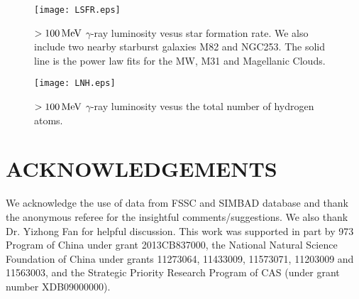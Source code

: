 \documentclass[useAMS,usenatbib,referee]{mn2e}
\begin{document}
\begin{figure}
\texttt{[image: LSFR.eps]}
 \caption{$>100\,\rm MeV$ $\gamma$-ray luminosity vesus star formation rate. We also include two nearby starburst galaxies M82 and NGC253. The solid line is the power law fits for the MW, M31 and Magellanic Clouds.}
 \label{lsfr}
\end{figure}

\begin{figure}
\texttt{[image: LNH.eps]}
 \caption{$>100\,\rm MeV$ $\gamma$-ray luminosity vesus the total number of hydrogen atoms.}
 \label{lnh}
\end{figure}

\section*{ACKNOWLEDGEMENTS}
We acknowledge the use of data from FSSC and SIMBAD database and thank the anonymous referee for the insightful comments/suggestions. We also thank Dr. Yizhong Fan for helpful discussion. This work was supported in part by 973 Program of China under grant 2013CB837000, the National Natural Science Foundation of China under grants 11273064, 11433009, 11573071, 11203009 and 11563003, and the Strategic Priority Research Program of CAS (under grant number XDB09000000).
\end{document}

